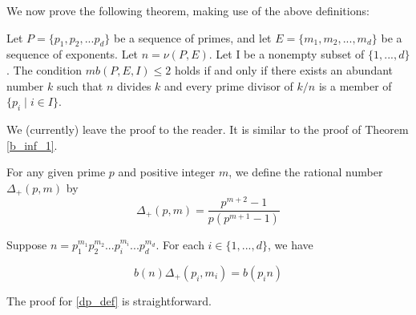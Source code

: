 \documentclass[../paper.tex]{article}
\begin{document}
We now prove the following theorem, making use of the above
definitions:

\begin{theorem}
Let $P = \{p_1, p_2, ... p_d\}$ be a sequence of primes, and let
$E = \{m_1, m_2, ..., m_d\}$ be a sequence of exponents. Let $n =
\nu(P,E)$. Let I be a nonempty subset of $\{1, ..., d\}$. The 
condition $mb(P,E,I) \leq 2$ holds if and only if there exists an 
abundant number $k$ such that $n$ divides $k$ and every prime 
divisor of $k/n$ is a member of $\{p_i \mid i \in I\}$.
\end{theorem}

We (currently) leave the proof to the reader. It is 
similar to the proof of Theorem {\ref{b_inf_1}}.

For any given prime $p$ and positive integer $m$, we define the
rational number $\Delta_+(p,m)$ by
$$\Delta_+(p,m) = \frac{p^{m+2} - 1}{ p (p^{m + 1} -
1)}$$

\begin{theorem}[Property]\label{dp_def}
Suppose $n = p_1^{m_1} p_2^{m_2} ... p_i^{m_i} ... p_d^{m_d}$.
For each $i \in \{1,...,d\}$, we have

$$ b(n) \Delta_+(p_i, m_i) = b(p_i n)$$

\end{theorem}

The proof for {\ref{dp_def}} is straightforward.
\end{document}
